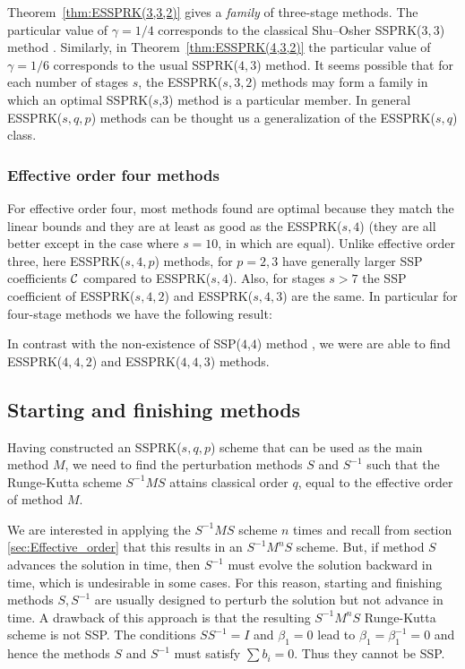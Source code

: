 Theorem~\ref{thm:ESSPRK(3,3,2)} gives a \emph{family} of three-stage methods. 
The particular value of $\gamma = 1/4$ corresponds to the classical Shu--Osher 
SSPRK($3,3$) method \cite{Gottlieb1998}.
Similarly, in Theorem~\ref{thm:ESSPRK(4,3,2)} the particular value of $\gamma = 1/6$ 
corresponds to the usual SSPRK($4,3$) method.
It seems possible that for each number of stages $s$, the ESSPRK($s, 3, 2$) methods may 
form a family in which an optimal SSPRK($s$,$3$) method is a particular member. 
In general ESSPRK($s,q,p$) methods can be thought us a generalization of the ESSPRK($s,q$) 
class. 

\subsubsection{Effective order four methods}\label{subsubsec:4th_ESSPRK}
For effective order four, most methods found are optimal because they match the linear 
bounds and they are at least as good as the ESSPRK($s,4$) (they are all better except in the 
case where $s =10$, in which are equal). 
Unlike effective order three, here ESSPRK($s,4,p$) methods, for $p = 2,3$ have generally 
larger SSP coefficients $\mathcal{C}$ compared to ESSPRK($s,4$). 
Also, for stages $s > 7$ the SSP coefficient of ESSPRK($s,4,2$) and ESSPRK($s,4,3$) are the 
same. 
In particular for four-stage methods we have the following result:
\begin{result}
	In contrast with the non-existence of SSP($4$,$4$) method \cite{Gottlieb1998,Ruuth2002}, 
	we were are able to find ESSPRK($4,4,2$) and ESSPRK($4,4,3$) methods.
\end{result}

\subsection{Starting and finishing methods}\label{subsec:starting_finishing}
Having constructed an SSPRK($s,q,p$) scheme that can be used as the main method $M$, we 
need to find the perturbation methods $S$ and $S^{-1}$ such that the Runge-Kutta scheme 
$S^{-1}MS$ attains classical order $q$, equal to the effective order of method $M$. 

We are interested in applying the $S^{-1}MS$ scheme $n$ times and recall from section 
\ref{sec:Effective_order} that this results in an $S^{-1}M^nS$ scheme. 
But, if method $S$ advances the solution in time, then $S^{-1}$ must evolve the solution 
backward in time, which is undesirable in some cases. 
For this reason, starting and finishing methods $S, S^{-1}$ are usually designed to perturb
the solution but not advance in time. 
A drawback of this approach is that the resulting $S^{-1}M^nS$ Runge-Kutta scheme is not 
SSP. 
The conditions $SS^{-1} = I$ and $\beta_1 = 0$ lead to $\beta_1 = \beta^{-1}_1 = 0$ and 
hence the methods $S$ and $S^{-1}$ must satisfy $\sum b_i = 0$. 
Thus they cannot be SSP.

